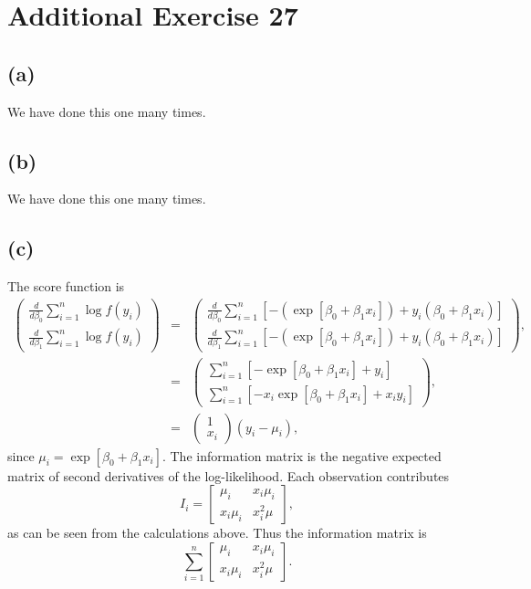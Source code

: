 \section*{Additional Exercise 27}

\subsection*{(a)}
We have done this one many times.

\subsection*{(b)}
We have done this one many times.

\subsection*{(c)}
The score function is
\begin{eqnarray*}
\left(\begin{array}{c}
\frac{d}{d\beta_{0}}\sum_{i=1}^{n}\log f(y_{i})\\
\frac{d}{d\beta_{1}}\sum_{i=1}^{n}\log f(y_{i})
\end{array}\right) & = & \left(\begin{array}{c}
\frac{d}{d\beta_{0}}\sum_{i=1}^{n}\left[-(\exp[\beta_{0}+\beta_{1}x_{i}])+y_{i}(\beta_{0}+\beta_{1}x_{i})\right]\\
\frac{d}{d\beta_{1}}\sum_{i=1}^{n}\left[-(\exp[\beta_{0}+\beta_{1}x_{i}])+y_{i}(\beta_{0}+\beta_{1}x_{i})\right]
\end{array}\right),\\
 & = & \left(\begin{array}{c}
\sum_{i=1}^{n}\left[-\exp[\beta_{0}+\beta_{1}x_{i}]+y_{i}\right]\\
\sum_{i=1}^{n}\left[-x_{i}\exp[\beta_{0}+\beta_{1}x_{i}]+x_{i}y_{i}\right]
\end{array}\right),\\
 & = & \left(\begin{array}{c}
1\\
x_{i}
\end{array}\right)\left(y_{i}-\mu_{i}\right),
\end{eqnarray*}
since $\mu_{i}=\exp[\beta_{0}+\beta_{1}x_{i}]$.
The information matrix is the negative expected matrix of second derivatives
of the log-likelihood. Each observation contributes
\[
I_{i}=\left[\begin{array}{cc}
\mu_{i} & x_{i}\mu_{i}\\
x_{i}\mu_{i} & x_{i}^{2}\mu
\end{array}\right],
\]
as can be seen from the calculations above. Thus the information matrix
is
\[
\sum_{i=1}^{n}\left[\begin{array}{cc}
\mu_{i} & x_{i}\mu_{i}\\
x_{i}\mu_{i} & x_{i}^{2}\mu
\end{array}\right].
\]

